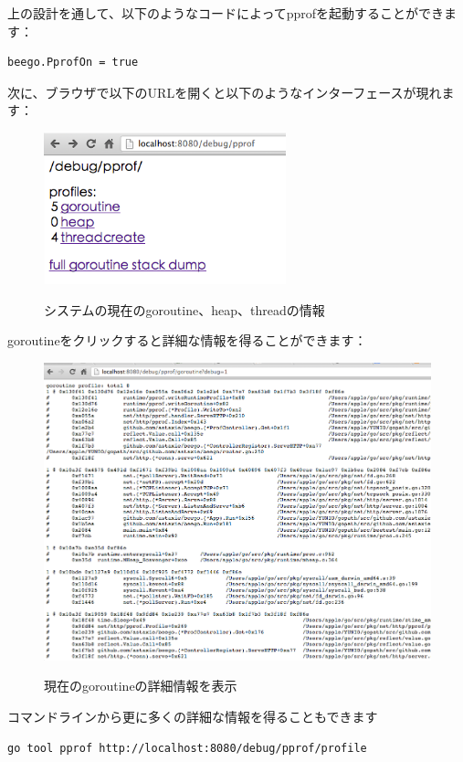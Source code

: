 上の設計を通して、以下のようなコードによってpprofを起動することができます：


\begin{lstlisting}[numbers=none]
beego.PprofOn = true
\end{lstlisting}

次に、ブラウザで以下のURLを開くと以下のようなインターフェースが現れます： 

\begin{figure}[H]
   \includegraphics[width=7cm]{14.6.pprof.png}
   \label{図14.7}
   \caption{システムの現在のgoroutine、heap、threadの情報}
\end{figure}

goroutineをクリックすると詳細な情報を得ることができます：


\begin{figure}[H]
   \includegraphics[width=14cm]{14.6.pprof2.png}
   \label{図14.8}
   \caption{現在のgoroutineの詳細情報を表示}
\end{figure}

コマンドラインから更に多くの詳細な情報を得ることもできます

\begin{lstlisting}[numbers=none]
go tool pprof http://localhost:8080/debug/pprof/profile
\end{lstlisting}

